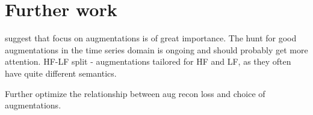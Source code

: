\documentclass[../../thesis.tex]{subfiles}
\begin{document}
\section{Further work}
\cite{morningstar2024augmentations} suggest that focus on augmentations is of great importance. The hunt for good augmentations in the time series domain is ongoing and should probably get more attention.\newline
HF-LF split - augmentations tailored for HF and LF, as they often have quite different semantics.\newline

Further optimize the relationship between aug recon loss and choice of augmentations.
\end{document}
